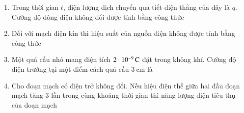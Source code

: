 \begin{enumerate}[label=\bfseries Câu \arabic*:]
\item Trong thời gian $t$, điện lượng dịch chuyển qua tiết diện thẳng của dây là $q$. Cường độ dòng điện không đổi được tính bằng công thức

\item Đối với mạch điện kín thì hiệu suất của nguồn điện không được tính bằng công thức

\item Một quả cầu nhỏ mang điện tích $\SI{2E-9}{\coulomb}$ đặt trong không khí. Cường độ điện trường tại một điểm cách quả cầu $\SI{3}{\centi\meter}$ là

\item Cho đoạn mạch có điện trở không đổi. Nếu hiệu điện thế giữa hai đầu đoạn mạch tăng 3 lần trong cùng khoảng thời gian thì năng lượng điện tiêu thụ của đoạn mạch


\end{enumerate}
